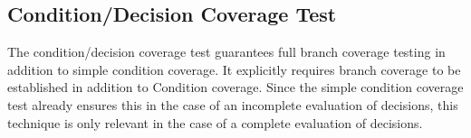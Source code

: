 



	\subsection{Condition/Decision Coverage Test}

	The condition/decision coverage test guarantees full branch coverage testing in addition to simple condition coverage. It explicitly requires branch coverage to be established in addition to Condition coverage. Since the simple condition coverage test already ensures this in the case of an incomplete evaluation of decisions, this technique is only relevant in the case of a complete evaluation of decisions. %


